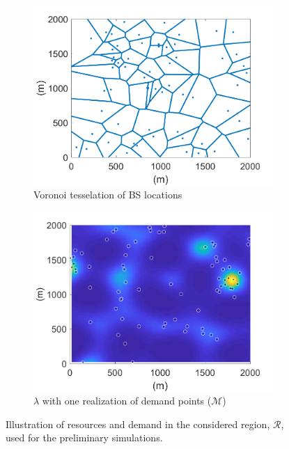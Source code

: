 \documentclass[12pt,dvipsnames]{report}
\begin{document}
\begin{figure}[ht]
	\centering
	\begin{subfigure}{.49\textwidth}
		\centering
		\includegraphics[width=1\linewidth]{Figures/Prelim_BSLocationsVoronoi}
		\caption{\small Voronoi tesselation of BS locations}
		\label{fig:Prelim_BSLocVor}
	\end{subfigure} \hfill
	\begin{subfigure}{.49\textwidth}
		\centering
		\includegraphics[width=1\linewidth]{Figures/Prelim_SSLTnsPPP_demandpointreal}
		\caption{\small $\lambda$ with one realization of demand points ($\mathcal{M}$)}
		\label{fig:Prelim_SSLTDPReal}
	\end{subfigure}
	\caption[Illustration of resources and demand used for the preliminary simulations]{Illustration of resources and demand in the considered region, $\mathcal{R}$, used for the preliminary simulations.}
	\label{fig:Prelim_NetworkArea}
\end{figure}
\end{document}
